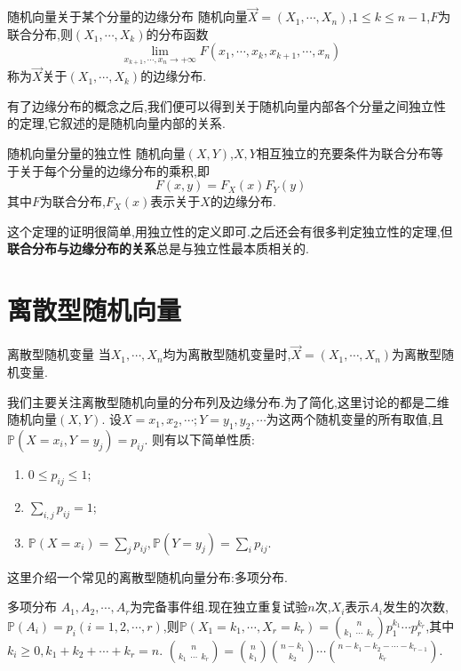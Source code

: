 \documentclass[lang=cn,10pt]{elegantbook}
\begin{document}
\begin{definition}{随机向量关于某个分量的边缘分布}{}
    随机向量$\overrightarrow{X}=(X_1,\cdots,X_n)$,$1\leq k\leq n-1$,$F$为联合分布,则$(X_1,\cdots,X_k)$的分布函数
    $$\lim_{x_{k+1},\cdots,x_n\to +\infty}F(x_1,\cdots,x_k,x_{k+1},\cdots,x_n)$$
    称为$\overrightarrow{X}$关于$(X_1,\cdots,X_k)$的边缘分布.
\end{definition}

有了边缘分布的概念之后,我们便可以得到关于随机向量内部各个分量之间独立性的定理,它叙述的是随机向量内部的关系.

\begin{theorem}{随机向量分量的独立性}{}
    随机向量$(X,Y)$,$X,Y$相互独立的充要条件为联合分布等于关于每个分量的边缘分布的乘积,即
    $$F(x,y)=F_X(x)F_Y(y)$$
    其中$F$为联合分布,$F_X(x)$表示关于$X$的边缘分布.
\end{theorem}

这个定理的证明很简单,用独立性的定义即可.之后还会有很多判定独立性的定理,但\textbf{联合分布与边缘分布的关系}总是与独立性最本质相关的.
\section{离散型随机向量}
\begin{definition}{离散型随机变量}{}
    当$X_1,\cdots,X_n$均为离散型随机变量时,$\overrightarrow{X}=(X_1,\cdots,X_n)$为离散型随机变量.
\end{definition}
我们主要关注离散型随机向量的分布列及边缘分布.为了简化,这里讨论的都是二维随机向量$(X,Y)$.
设$X=x_1,x_2,\cdots;Y=y_1,y_2,\cdots$为这两个随机变量的所有取值,且$\mathbb{P}(X=x_i,Y=y_j)=p_{ij}$.
则有以下简单性质:
\begin{enumerate}
    \item $0\leq p_{ij}\leq 1$;
    \item $\sum_{i,j}p_{ij}=1$;
    \item $\mathbb{P}(X=x_i)=\sum_{j}p_{ij},\mathbb{P}(Y=y_j)=\sum_{i}p_{ij}$.
\end{enumerate}

这里介绍一个常见的离散型随机向量分布:多项分布.
\begin{definition}{多项分布}{}
    $A_1,A_2,\cdots,A_r$为完备事件组.现在独立重复试验$n$次,$X_i$表示$A_i$发生的次数,
    $\mathbb{P}(A_i)=p_i(i=1,2,\cdots,r)$,则$\mathbb{P}(X_1=k_1,\cdots,X_r=k_r)=\binom{n}{k_1\ \ \cdots \ \ k_r} p_1^{k_1}\cdots p_r^{k_r}$,其中$k_i\geq 0,k_1+k_2+\cdots+k_r=n$.
    $\binom{n}{k_1\ \ \cdots \ \ k_r}=\binom{n}{k_1}\binom{n-k_1}{k_2}\cdots\binom{n-k_1-k_2-\cdots-k_{r-1}}{k_r}$.
\end{definition}
\end{document}
